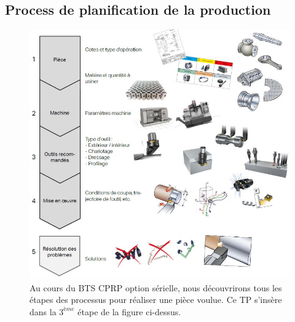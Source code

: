 \documentclass[12pt]{article}
\begin{document}
\subsection{Process de planification de la production}
\begin{figure}[h]
\centering
\includegraphics[width=0.93\linewidth]{Images/P1.JPG}
\caption{Au cours du BTS CPRP option sérielle, nous découvrirons tous les étapes des processus pour réaliser une pièce voulue. Ce TP s'insère dans la $3^{ème}$ étape de la figure ci-dessus.}
\label{P1}
\end{figure}


\newpage
\end{document}
